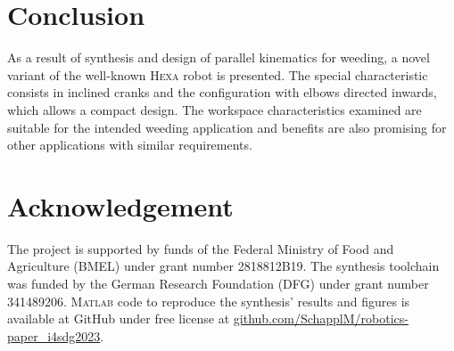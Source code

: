 \documentclass[runningheads]{llncs}
\begin{document}
\section{Conclusion}
As a result of synthesis and design of parallel kinematics for weeding, a novel variant of the well-known \textsc{Hexa} robot is presented. The special characteristic consists in inclined cranks and the configuration with elbows directed inwards, which allows a compact design. The workspace characteristics examined are suitable for the intended weeding application and benefits are also promising for other applications with similar requirements. 
%
%
\section*{Acknowledgement}
The project is supported by funds of the Federal Ministry of Food and Agriculture (BMEL) under grant number 2818812B19. 
The synthesis toolchain was funded by the German Research Foundation (DFG) under grant number 341489206.
\textsc{Matlab} code to reproduce the synthesis' results and figures is available at GitHub under free license at \url{github.com/SchapplM/robotics-paper_i4sdg2023}.

% 


\end{document}
